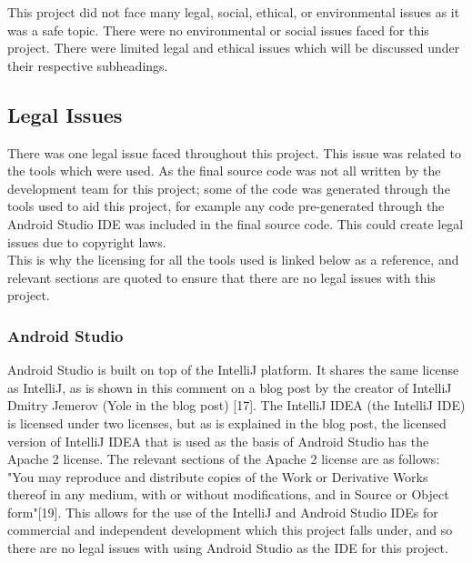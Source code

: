 \documentclass{article}
\begin{document}
This project did not face many legal, social, ethical, or environmental issues as it was a safe topic. There were no environmental or social issues faced for this project. There were limited legal and ethical issues which will be discussed under their respective subheadings. 

\subsection{Legal Issues}

There was one legal issue faced throughout this project. This issue was related to the tools which were used. As the final source code was not all written by the development team for this project; some of the code was generated through the tools used to aid this project, for example any code pre-generated through the Android Studio IDE was included in the final source code. This could create legal issues due to copyright laws. \\

This is why the licensing for all the tools used is linked below as a reference, and relevant sections are quoted to ensure that there are no legal issues with this project. \\

\subsubsection{Android Studio}

Android Studio is built on top of the IntelliJ platform. It shares the same license as IntelliJ, as is shown in this comment on a blog post by the creator of IntelliJ Dmitry Jemerov (Yole in the blog post) [17]. The IntelliJ IDEA (the IntelliJ IDE) is licensed under two licenses, but as is explained in the blog post, the licensed version of IntelliJ IDEA that is used as the basis of Android Studio has the Apache 2 license. The relevant sections of the Apache 2 license are as follows: "You may reproduce and distribute copies of the Work or Derivative Works thereof in any medium, with or without modifications, and in Source or Object form"[19]. This allows for the use of the IntelliJ and Android Studio IDEs for commercial and independent development which this project falls under, and so there are no legal issues with using Android Studio as the IDE for this project. \\

\end{document}
